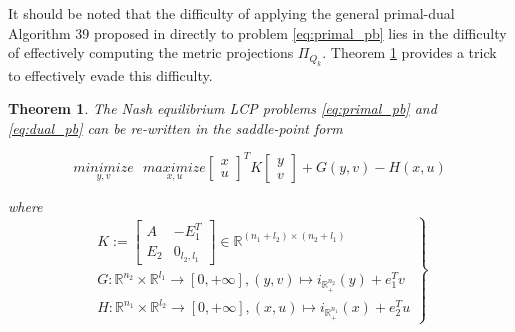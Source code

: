\documentclass{article} %
\newtheorem{theorem}{Theorem} \newtheorem{lemma}[theorem]{Lemma}
\begin{document}
It should be noted that the difficulty of applying the general primal-dual Algorithm 39 proposed in \cite{chambolle2010} directly to problem \eqref{eq:primal_pb} lies in the difficulty of effectively computing the metric projections $\Pi_{Q_k}$. Theorem \ref{thm:pd} provides a trick to effectively evade this difficulty.

\begin{theorem}
  The Nash equilibrium LCP problems \eqref{eq:primal_pb} and \eqref{eq:dual_pb} can be re-written in the saddle-point form
  
  \begin{equation}
    \underset{y, v}{minimize}\text{ }\underset{x, u}{maximize}
           {\begin{bmatrix}x\\u\end{bmatrix}^TK\begin{bmatrix}y\\v\end{bmatrix} + G(y, v) - H(x, u)}
           \label{eq:unconstrained_pb}
  \end{equation}

  where
  \begin{equation}
    \left .
    \begin{split}
      K :=
      \left[
        \begin{array}{c|c}
          A & -E_1^T \\ \hline
          E_2 & 0_{l_2, l_1}
        \end{array}
        \right] \in \mathbb{R}^{(n_1 + l_2) \times (n_2 + l_1)} \\
      G: \mathbb{R}^{n_2} \times \mathbb{R}^{l_1} \rightarrow [0, +\infty], (y, v) \mapsto i_{\mathbb{R}^{n_2}_+}(y) + e_1^Tv\\
      H: \mathbb{R}^{n_1} \times \mathbb{R}^{l_2} \rightarrow [0, +\infty], (x, u) \mapsto i_{\mathbb{R}^{n_1}_+}(x) + e_2^Tu
    \end{split}
    \right\}
    \label{eq:things}
  \end{equation}
  

  \label{thm:pd}
\end{theorem}
\end{document}
